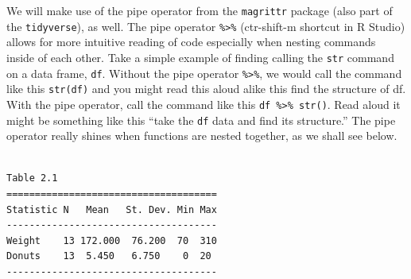 \documentclass[]{book}
\newenvironment{Shaded}{\begin{snugshade}}{\end{snugshade}}
\newcommand{\CommentTok}[1]{\textcolor[rgb]{0.56,0.35,0.01}{\textit{#1}}}
\newcommand{\DataTypeTok}[1]{\textcolor[rgb]{0.13,0.29,0.53}{#1}}
\newcommand{\KeywordTok}[1]{\textcolor[rgb]{0.13,0.29,0.53}{\textbf{#1}}}
\newcommand{\NormalTok}[1]{#1}
\newcommand{\OperatorTok}[1]{\textcolor[rgb]{0.81,0.36,0.00}{\textbf{#1}}}
\newcommand{\StringTok}[1]{\textcolor[rgb]{0.31,0.60,0.02}{#1}}
\begin{document}
We will make use of the pipe operator from the \texttt{magrittr} package (also part of the \texttt{tidyverse}), as well. The pipe operator \texttt{\%\textgreater{}\%} (ctr-shift-m shortcut in R Studio) allows for more intuitive reading of code especially when nesting commands inside of each other. Take a simple example of finding calling the \texttt{str} command on a data frame, \texttt{df}. Without the pipe operator \texttt{\%\textgreater{}\%}, we would call the command like this \texttt{str(df)} and you might read this aloud alike this find the structure of df. With the pipe operator, call the command like this \texttt{df\ \%\textgreater{}\%\ str()}. Read aloud it might be something like this ``take the \texttt{df} data and find its structure.'' The pipe operator really shines when functions are nested together, as we shall see below.

\begin{Shaded}
\end{Shaded}

\begin{verbatim}

Table 2.1
=====================================
Statistic N   Mean   St. Dev. Min Max
-------------------------------------
Weight    13 172.000  76.200  70  310
Donuts    13  5.450   6.750    0  20 
-------------------------------------
\end{verbatim}
\end{document}

